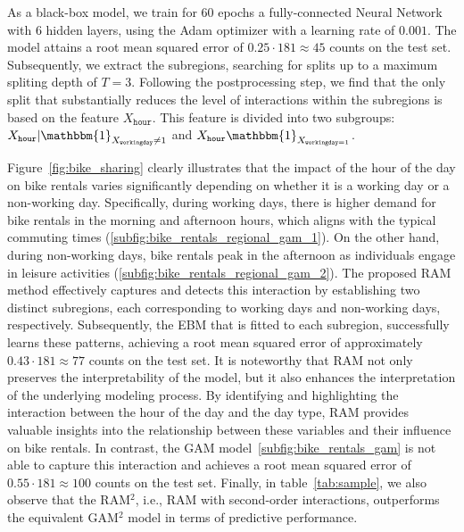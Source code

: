 \documentclass[12pt]{article}
\newcommand{\when}[1]{\mathbbm{1}_{#1}}
\begin{document}
As a black-box model, we train for \(60\) epochs a fully-connected Neural Network with 6 hidden layers, using the Adam optimizer with a learning rate of $0.001$.
The model attains a root mean squared error of \( 0.25 \cdot 181 \approx 45\) counts on the test set.
Subsequently, we extract the subregions, searching for splits up to a maximum spliting depth of \(T=3\).
Following the postprocessing step, we find that the only split that substantially reduces the level of interactions within the subregions is based on the feature
$X_{\mathtt{hour}}$. This feature is divided into two subgroups: $X_{\mathtt{hour}} | \when{X_{\mathtt{workingday}} \neq 1}$ and $X_{\mathtt{hour}} \when{X_{\mathtt{workingday} = 1}}$.

Figure~\ref{fig:bike_sharing} clearly illustrates that the impact of the hour of the day on bike rentals varies
significantly depending on whether it is a working day or a non-working day.
Specifically, during working days, there is higher demand for bike rentals in the morning and afternoon hours,
which aligns with the typical commuting times (\ref{subfig:bike_rentals_regional_gam_1}).
On the other hand, during non-working days, bike rentals peak in the afternoon as individuals engage in
leisure activities (\ref{subfig:bike_rentals_regional_gam_2}).
The proposed RAM method effectively captures and detects this interaction by establishing two distinct subregions,
each corresponding to working days and non-working days, respectively.
Subsequently, the EBM that is fitted to each subregion, successfully learns these patterns,
achieving a root mean squared error of approximately \( 0.43 \cdot 181 \approx 77\) counts on the test set.
It is noteworthy that RAM not only preserves the interpretability of the model,
but it also enhances the interpretation of the underlying modeling process.
By identifying and highlighting the interaction between the hour of the day and the day type,
RAM provides valuable insights into the relationship between these variables and their influence on bike rentals.
In contrast, the GAM model~\ref{subfig:bike_rentals_gam} is not able to capture this interaction and
achieves a root mean squared error of \( 0.55 \cdot 181 \approx 100\) counts on the test set.
Finally, in table~\ref{tab:sample}, we also observe that the RAM$^2$, i.e., RAM with second-order interactions,
outperforms the equivalent GAM$^2$ model in terms of predictive performance.
\end{document}
